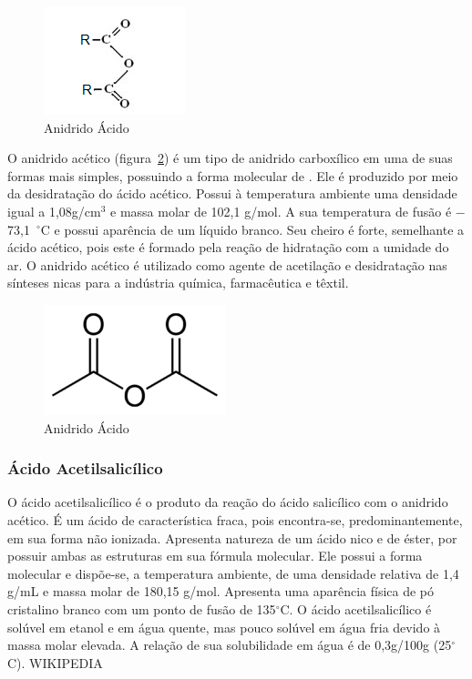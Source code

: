 \begin{figure}[H]
\begin{center}
    \includegraphics[scale=1.2]{figuras/anidrido_acido.png}
\end{center}
\caption{Anidrido Ácido}
\label{fig:ani_acido}
\end{figure}

O anidrido acético (figura~\ref{fig:ani_acetico}) é um tipo de anidrido carboxílico em uma de suas formas mais
simples, possuindo a forma molecular de . Ele é produzido por meio da desidratação do ácido
acético.  Possui à temperatura ambiente uma densidade igual a 1,08g/cm$^3$ e massa molar de 102,1
g/mol. A sua temperatura de fusão é $-$73,1 $^\circ$C e possui aparência de um líquido branco. Seu cheiro é
forte, semelhante a ácido acético, pois este é formado pela reação de hidratação com a umidade do
ar. O anidrido acético é utilizado como agente de acetilação e desidratação nas sínteses nicas para
a indústria química, farmacêutica e têxtil.

\begin{figure}[H]
\begin{center}
    \includegraphics[scale=0.8]{figuras/anidrido_acetico.png}
\end{center}
\caption{Anidrido Ácido}
\label{fig:ani_acetico}
\end{figure}

\subsubsection{Ácido Acetilsalicílico}

O ácido acetilsalicílico é o produto da reação do ácido salicílico com o anidrido acético. É um
ácido de característica fraca, pois encontra-se, predominantemente, em sua forma não ionizada.
Apresenta natureza de um ácido nico e de éster, por possuir ambas as estruturas em sua fórmula
molecular. Ele possui a forma molecular  e dispõe-se, a temperatura ambiente, de uma densidade
relativa de 1,4 g/mL e massa molar de 180,15 g/mol. Apresenta uma aparência física de pó cristalino
branco com um ponto de fusão de 135$^\circ$C. O ácido acetilsalicílico é solúvel em etanol e em água
quente, mas pouco solúvel em água fria devido à massa molar elevada.  A relação de sua solubilidade
em água é de 0,3g/100g (25$^\circ$C). WIKIPEDIA

